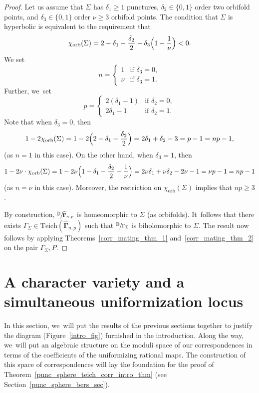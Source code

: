 \documentclass[JEP,XML,SOM,Unicode,NoFloatCountersInSection,published]{cedram}
\let\faktor\sfrac
\theoremstyle{definition}
\theoremstyle{remark}
\newcommand{\D}{\mathbb{D}}
\begin{document}
\begin{proof}
Let us assume that $\Sigma$ has $\delta_1\geq 1$ punctures, $\delta_2\in\{0,1\}$ order two orbifold points, and $\delta_3\in\{0,1\}$ order $\nu\geq 3$ orbifold points. The condition that $\Sigma$ is hyperbolic is equivalent to the requirement that
\[
\chi_{\mathrm{orb}}(\Sigma)=2-\delta_1-\frac{\delta_2}{2}-\delta_3\Bigl(1-\frac{1}{\nu}\Bigr)<0.
\]
We set
\[
n=\begin{cases}
1 & \text{if } \delta_3=0,\\
\nu & \text{if } \delta_3=1.
\end{cases}
\]
Further, we~set
\[
p=\begin{cases}
2(\delta_1-1) & \text{if } \delta_2=0,\\
2\delta_1-1 & \text{if } \delta_2=1.
\end{cases}
\]
Note that when $\delta_3=0$, then
\[
1-2\chi_{\mathrm{orb}}(\Sigma)=1-2 \Bigl(2-\delta_1-\frac{\delta_2}{2} \Bigr)=2\delta_1+\delta_2-3=p-1=np-1,
\]
(as $n=1$ in this case). On the other hand, when $\delta_3=1$, then
\[
1-2\nu\cdot\chi_{\mathrm{orb}}(\Sigma)=1-2\nu \Bigl(1-\delta_1-\frac{\delta_2}{2}+\frac{1}{\nu} \Bigr)=2\nu\delta_1+\nu\delta_2-2\nu-1=\nu p-1=np-1
\]
(as $n=\nu$ in this case). Moreover, the restriction on $\chi_{\mathrm{orb}}(\Sigma)$ implies that $np\geq 3$.

By construction, $\faktor{\D}{\widehat{\pmb{\Gamma}}_{n,p}}$ is homeomorphic to $\Sigma$ (as orbifolds). It~follows that there exists $\Gamma_\Sigma\in\mathrm{Teich}(\widehat{\pmb{\Gamma}}_{n,p})$ such that $\faktor{\D}{\Gamma_\Sigma}$ is biholomorphic to $\Sigma$.
The result now follows by applying Theorems~\ref{corr_mating_thm_1} and~\ref{corr_mating_thm_2} on the pair $\Gamma_\Sigma, P$.
\end{proof}

\section{A character variety and a simultaneous uniformization locus}\label{char_var_sec}

In this section, we~will put the results of the previous sections together to justify the diagram (Figure~\ref{intro_fig}) furnished in the introduction.
Along the way, we~will put an algebraic structure on the moduli space of our correspondences in terms of the coefficients of the uniformizing rational maps. The construction of this space of correspondences will lay the foundation for the proof of Theorem~\ref{punc_sphere_teich_corr_intro_thm} (see Section~\ref{punc_sphere_bers_sec}).
\end{document}
